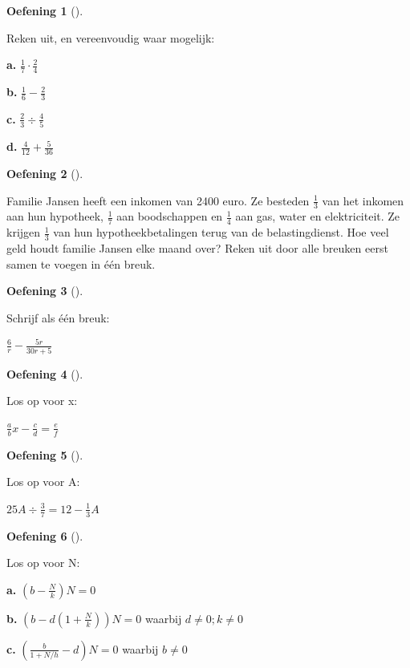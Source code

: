\documentclass[
  a4paper,
]{scrbook}
\theoremstyle{definition}
\newtheorem{exercise}{Oefening}[chapter]
\theoremstyle{remark}
\begin{document}
\begin{exercise}[]\protect\hypertarget{exr-breuken-1}{}\label{exr-breuken-1}

Reken uit, en vereenvoudig waar mogelijk:

\textbf{a.} \(\frac{1}{7}\cdot\frac{2}{4}\)

\textbf{b.} \(\frac{1}{6}-\frac{2}{3}\)

\textbf{c.} \(\frac{2}{3}\div\frac{4}{5}\)

\textbf{d.} \(\frac{4}{12}+\frac{5}{36}\)

\end{exercise}

\begin{exercise}[]\protect\hypertarget{exr-breuken-2}{}\label{exr-breuken-2}

Familie Jansen heeft een inkomen van 2400 euro. Ze besteden
\(\frac{1}{3}\) van het inkomen aan hun hypotheek, \(\frac{1}{7}\) aan
boodschappen en \(\frac{1}{4}\) aan gas, water en elektriciteit. Ze
krijgen \(\frac{1}{3}\) van hun hypotheekbetalingen terug van de
belastingdienst. Hoe veel geld houdt familie Jansen elke maand over?
Reken uit door alle breuken eerst samen te voegen in één breuk.

\end{exercise}

\begin{exercise}[]\protect\hypertarget{exr-breuken-3}{}\label{exr-breuken-3}

Schrijf als één breuk:

\(\frac{6}{r} - \frac{5r}{30r+5}\)

\end{exercise}

\begin{exercise}[]\protect\hypertarget{exr-breuken-4}{}\label{exr-breuken-4}

Los op voor x:

\(\frac{a}{b}x - \frac{c}{d} = \frac{e}{f}\)

\end{exercise}

\begin{exercise}[]\protect\hypertarget{exr-breuken-5}{}\label{exr-breuken-5}

Los op voor A:

\(25A\div\frac{3}{7} = 12 - \frac{1}{3}A\)

\end{exercise}

\begin{exercise}[]\protect\hypertarget{exr-breuken-6}{}\label{exr-breuken-6}

Los op voor N:

\textbf{a.} \((b-\frac{N}{k})N = 0\)

\textbf{b.} \((b-d(1+\frac{N}{k}))N = 0\) waarbij \(d\neq0; k\neq0\)

\textbf{c.} \((\frac{b}{1+N/h}-d)N = 0\) waarbij \(b\neq0\)

\end{exercise}
\end{document}

